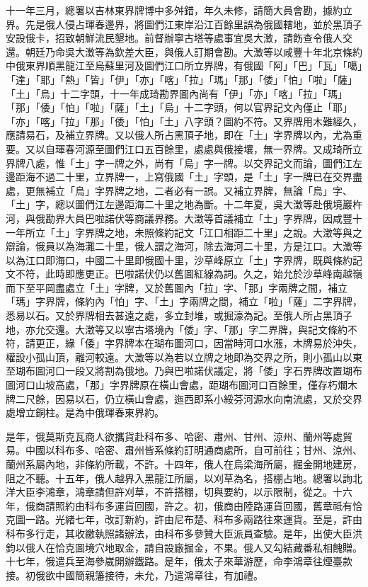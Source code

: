 \begin{pinyinscope}
十一年三月，總署以吉林東界牌博中多舛錯，年久未修，請簡大員會勘，據約立界。先是俄人侵占琿春邊界，將圖們江東岸沿江百餘里誤為俄國轄地，並於黑頂子安設俄卡，招致朝鮮流民墾地。前督辦寧古塔等處事宜吳大澂，請飭查令俄人交還。朝廷乃命吳大澂等為欽差大臣，與俄人訂期會勘。大澂等以咸豐十年北京條約中俄東界順黑龍江至烏蘇里河及圖們江口所立界牌，有俄國「阿」「巴」「瓦」「噶」「達」「耶」「熱」「皆」「伊」「亦」「喀」「拉」「瑪」「那」「倭」「怕」「啦」「薩」「土」「烏」十二字頭，十一年成琦勘界圖內尚有「伊」「亦」「喀」「拉」「瑪」「那」「倭」「怕」「啦」「薩」「土」「烏」十二字頭，何以官界記文內僅止「耶」「亦」「喀」「拉」「那」「倭」「怕」「土」八字頭？圖約不符。又界牌用木難經久，應請易石，及補立界牌。又以俄人所占黑頂子地，即在「土」字界牌以內，尤為重要。又以自琿春河源至圖們江口五百餘里，處處與俄接壤，無一界牌。又成琦所立界牌八處，惟「土」字一牌之外，尚有「烏」字一牌。以交界記文而論，圖們江左邊距海不過二十里，立界牌一，上寫俄國「土」字頭，是「土」字一牌已在交界盡處，更無補立「烏」字界牌之地，二者必有一誤。又補立界牌，無論「烏」字、「土」字，總以圖們江左邊距海二十里之地為斷。十二年夏，吳大澂等赴俄境巖杵河，與俄勘界大員巴啦諾伏等商議界務。大澂等首議補立「土」字界牌，因咸豐十一年所立「土」字界牌之地，未照條約記文「江口相距二十里」之說。大澂等與之辯論，俄員以為海灘二十里，俄人謂之海河，除去海河二十里，方是江口。大澂等以為江口即海口，中國二十里即俄國十里，沙草峰原立「土」字界牌，既與條約記文不符，此時即應更正。巴啦諾伏仍以舊圖紅線為詞。久之，始允於沙草峰南越嶺而下至平岡盡處立「土」字牌，又於舊圖內「拉」字、「那」字兩牌之間，補立「瑪」字界牌，條約內「怕」字、「土」字兩牌之間，補立「啦」「薩」二字界牌，悉易以石。又於界牌相去甚遠之處，多立封堆，或掘濠為記。至俄人所占黑頂子地，亦允交還。大澂等又以寧古塔境內「倭」字、「那」字二界牌，與記文條約不符，請更正，緣「倭」字界牌本在瑚布圖河口，因當時河口水漲，木牌易於沖失，權設小孤山頂，離河較遠。大澂等以為若以立牌之地即為交界之所，則小孤山以東至瑚布圖河口一段又將割為俄地。乃與巴啦諾伏議定，將「倭」字石界牌改置瑚布圖河口山坡高處，「那」字界牌原在橫山會處，距瑚布圖河口百餘里，僅存朽爛木牌二尺餘，因易以石，仍立橫山會處，迤西即系小綏芬河源水向南流處，又於交界處增立銅柱。是為中俄琿春東界約。

是年，俄莫斯克瓦商人欲攜貨赴科布多、哈密、肅州、甘州、涼州、蘭州等處貿易。中國以科布多、哈密、肅州皆系條約訂明通商處所，自可前往；甘州、涼州、蘭州系屬內地，非條約所載，不許。十四年，俄人在烏梁海所屬，掘金開地建房，阻之不聽。十五年，俄人越界入黑龍江所屬，以刈草為名，搭棚占地。總署以詢北洋大臣李鴻章，鴻章請但許刈草，不許搭棚，切與要約，以示限制，從之。十六年，俄商請照約由科布多運貨回國，許之。初，俄商由陸路運貨回國，舊章祗有恰克圖一路。光緒七年，改訂新約，許由尼布楚、科布多兩路往來運貨。至是，許由科布多行走，其收繳執照諸辦法，由科布多參贊大臣派員查驗。是年，出使大臣洪鈞以俄人在恰克圖境穴地取金，請自設廠掘金，不果。俄人又勾結藏番私相餽贈。十七年，俄遣兵至海參崴開辦鐵路。是年，俄太子來華游歷，命李鴻章往煙臺款接。初俄欲中國簡親籓接待，未允，乃遣鴻章往，有加禮。


\end{pinyinscope}
